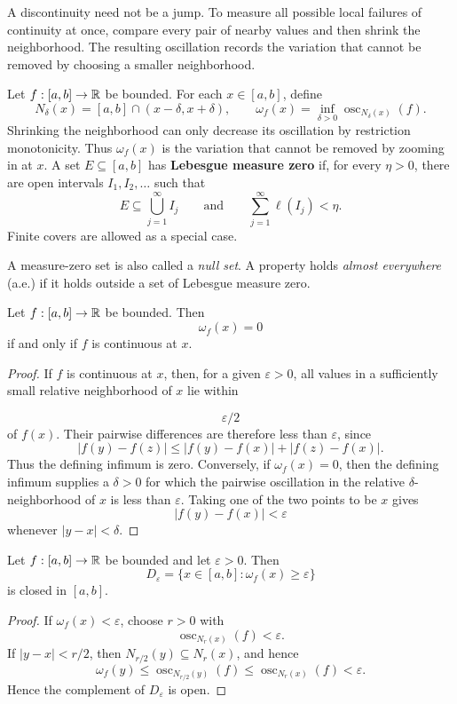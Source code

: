 A discontinuity need not be a jump. To measure all possible local failures
of continuity at once, compare every pair of nearby values and then shrink
the neighborhood. The resulting oscillation records the variation that
cannot be removed by choosing a smaller neighborhood.

\begin{definition}
Let $f:[a,b]\to\mathbb{R}$ be bounded.  For each $x\in[a,b]$, define
\[
N_\delta(x)=[a,b]\cap(x-\delta,x+\delta),
\qquad
\boxed{\omega_f(x)=\inf_{\delta>0}
\operatorname{osc}_{N_\delta(x)}(f).}
\]
Shrinking the neighborhood can only decrease its oscillation by restriction
monotonicity. Thus $\omega_f(x)$ is the variation that cannot be removed by
zooming in at $x$.
A set $E\subseteq[a,b]$ has \textbf{Lebesgue measure zero} if, for every $\eta>0$, there are open intervals $I_1,I_2,\ldots$ such that
\[
E\subseteq\bigcup_{j=1}^{\infty}I_j
\qquad\text{and}\qquad
\sum_{j=1}^{\infty}\ell(I_j)<\eta.
\]
Finite covers are allowed as a special case.
\end{definition}

\begin{remark}
A measure-zero set is also called a \emph{null set}. A property holds
\emph{almost everywhere} (a.e.) if it holds outside a set of Lebesgue
measure zero.
\end{remark}

\begin{proposition}
\label{prop:oscillation-continuity}
Let $f:[a,b]\to\mathbb{R}$ be bounded.  Then
\[
\omega_f(x)=0
\]
if and only if $f$ is continuous at $x$.
\end{proposition}
\begin{proof}
If $f$ is continuous at $x$, then, for a given $\varepsilon>0$, all values
in a sufficiently small relative neighborhood of $x$ lie within

\[
\varepsilon/2
\]
 of $f(x)$.  Their pairwise differences are therefore less
than $\varepsilon$, since
\[
|f(y)-f(z)|\leq|f(y)-f(x)|+|f(z)-f(x)|.
\]
Thus the defining infimum is zero. Conversely, if
$\omega_f(x)=0$, then the defining infimum supplies a $\delta>0$ for which
the pairwise oscillation in the relative $\delta$-neighborhood of $x$ is
less than $\varepsilon$.  Taking one of the two points to be $x$ gives
\[
\lvert f(y)-f(x)\rvert<\varepsilon
\]
whenever $\lvert y-x\rvert<\delta$.
\end{proof}

\begin{proposition}
\label{prop:closed-oscillation-sets}
Let $f:[a,b]\to\mathbb{R}$ be bounded and let $\varepsilon>0$.  Then
\[
D_{\varepsilon}=\bigl\{x\in[a,b]:\omega_f(x)\geq\varepsilon\bigr\}
\]
is closed in $[a,b]$.
\end{proposition}
\begin{proof}
If $\omega_f(x)<\varepsilon$, choose $r>0$ with
\[
\operatorname{osc}_{N_r(x)}(f)<\varepsilon.
\]
If $|y-x|<r/2$, then $N_{r/2}(y)\subseteq N_r(x)$, and hence
\[
\omega_f(y)\leq\operatorname{osc}_{N_{r/2}(y)}(f)
\leq\operatorname{osc}_{N_r(x)}(f)<\varepsilon.
\]
Hence the complement of
$D_{\varepsilon}$ is open.
\end{proof}

